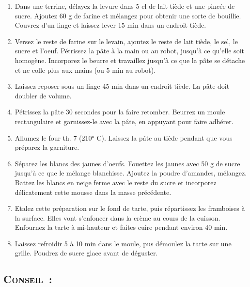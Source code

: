 \begin{enumerate}
\item  Dans une terrine, d\'elayez la levure dans 5 cl de lait ti\`ede et une pinc\'ee de sucre. Ajoutez 60 g de farine et m\'elangez pour obtenir une sorte de bouillie. Couvrez d’un linge et laissez lever 15 min dans un endroit ti\`ede.

\item  Versez le reste de farine sur le levain, ajoutez le reste de lait ti\`ede, le sel, le sucre et l’oeuf. P\'etrissez la p\^ate à la main ou au robot, jusqu’à ce qu’elle soit homog\`ene. Incorporez le beurre et travaillez jusqu’à ce que la p\^ate se d\'etache et ne colle plus aux mains (ou 5 min au robot).

\item Laissez reposer sous un linge 45 min dans un endroit ti\`ede. La p\^ate doit doubler de volume.

\item  P\'etrissez la p\^ate 30 secondes pour la faire retomber. Beurrez un moule rectangulaire et garnissez-le avec la p\^ate, en appuyant pour faire adh\'erer.

\item  Allumez le four th. 7 (210° C). Laissez la p\^ate au ti\`ede pendant que vous pr\'eparez la garniture.

\item  S\'eparez les blancs des jaunes d’oeufs. Fouettez les jaunes avec 50 g de sucre jusqu’à ce que le m\'elange blanchisse. Ajoutez la poudre d’amandes, m\'elangez. Battez les blancs en neige ferme avec le reste du sucre et incorporez d\'elicatement cette mousse dans la masse pr\'ec\'edente.

\item  Etalez cette pr\'eparation sur le fond de tarte, puis r\'epartissez les framboises à la surface. Elles vont s’enfoncer dans la cr\`eme au cours de la cuisson. Enfournez la tarte à mi-hauteur et faites cuire pendant environ 40 min.

\item  Laissez refroidir 5 à 10 min dans le moule, pus d\'emoulez la tarte sur une grille. Poudrez de sucre glace avant de d\'eguster. 
\end{enumerate}
\subsection*{\textsc{Conseil~:}}

